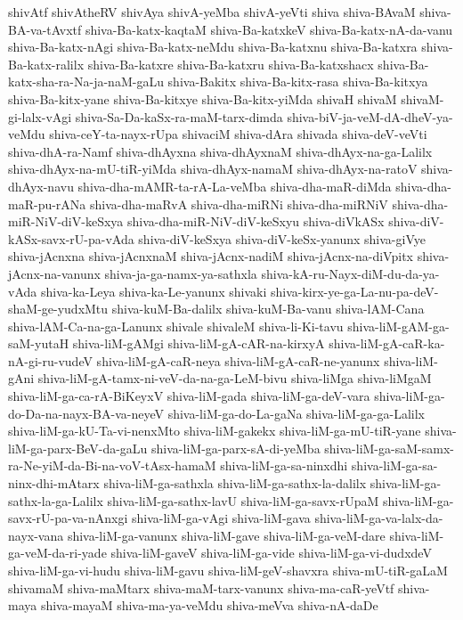 {shivAtf
shivAtheRV
shivAya
shivA-yeMba
shivA-yeVti
shiva
shiva-BAvaM
shiva-BA-va-tAvxtf
shiva-Ba-katx-kaqtaM
shiva-Ba-katxkeV
shiva-Ba-katx-nA-da-vanu
shiva-Ba-katx-nAgi
shiva-Ba-katx-neMdu
shiva-Ba-katxnu
shiva-Ba-katxra
shiva-Ba-katx-ralilx
shiva-Ba-katxre
shiva-Ba-katxru
shiva-Ba-katxshacx
shiva-Ba-katx-sha-ra-Na-ja-naM-gaLu
shiva-Bakitx
shiva-Ba-kitx-rasa
shiva-Ba-kitxya
shiva-Ba-kitx-yane
shiva-Ba-kitxye
shiva-Ba-kitx-yiMda
shivaH
shivaM
shivaM-gi-lalx-vAgi
shiva-Sa-Da-kaSx-ra-maM-tarx-dimda
shiva-biV-ja-veM-dA-dheV-ya-veMdu
shiva-ceY-ta-nayx-rUpa
shivaciM
shiva-dAra
shivada
shiva-deV-veVti
shiva-dhA-ra-Namf
shiva-dhAyxna
shiva-dhAyxnaM
shiva-dhAyx-na-ga-Lalilx
shiva-dhAyx-na-mU-tiR-yiMda
shiva-dhAyx-namaM
shiva-dhAyx-na-ratoV
shiva-dhAyx-navu
shiva-dha-mAMR-ta-rA-La-veMba
shiva-dha-maR-diMda
shiva-dha-maR-pu-rANa
shiva-dha-maRvA
shiva-dha-miRNi
shiva-dha-miRNiV
shiva-dha-miR-NiV-diV-keSxya
shiva-dha-miR-NiV-diV-keSxyu
shiva-diVkASx
shiva-diV-kASx-savx-rU-pa-vAda
shiva-diV-keSxya
shiva-diV-keSx-yanunx
shiva-giVye
shiva-jAcnxna
shiva-jAcnxnaM
shiva-jAcnx-nadiM
shiva-jAcnx-na-diVpitx
shiva-jAcnx-na-vanunx
shiva-ja-ga-namx-ya-sathxla
shiva-kA-ru-Nayx-diM-du-da-ya-vAda
shiva-ka-Leya
shiva-ka-Le-yanunx
shivaki
shiva-kirx-ye-ga-La-nu-pa-deV-shaM-ge-yudxMtu
shiva-kuM-Ba-dalilx
shiva-kuM-Ba-vanu
shiva-lAM-Cana
shiva-lAM-Ca-na-ga-Lanunx
shivale
shivaleM
shiva-li-Ki-tavu
shiva-liM-gAM-ga-saM-yutaH
shiva-liM-gAMgi
shiva-liM-gA-cAR-na-kirxyA
shiva-liM-gA-caR-ka-nA-gi-ru-vudeV
shiva-liM-gA-caR-neya
shiva-liM-gA-caR-ne-yanunx
shiva-liM-gAni
shiva-liM-gA-tamx-ni-veV-da-na-ga-LeM-bivu
shiva-liMga
shiva-liMgaM
shiva-liM-ga-ca-rA-BiKeyxV
shiva-liM-gada
shiva-liM-ga-deV-vara
shiva-liM-ga-do-Da-na-nayx-BA-va-neyeV
shiva-liM-ga-do-La-gaNa
shiva-liM-ga-ga-Lalilx
shiva-liM-ga-kU-Ta-vi-nenxMto
shiva-liM-gakekx
shiva-liM-ga-mU-tiR-yane
shiva-liM-ga-parx-BeV-da-gaLu
shiva-liM-ga-parx-sA-di-yeMba
shiva-liM-ga-saM-samx-ra-Ne-yiM-da-Bi-na-voV-tAsx-hamaM
shiva-liM-ga-sa-ninxdhi
shiva-liM-ga-sa-ninx-dhi-mAtarx
shiva-liM-ga-sathxla
shiva-liM-ga-sathx-la-dalilx
shiva-liM-ga-sathx-la-ga-Lalilx
shiva-liM-ga-sathx-lavU
shiva-liM-ga-savx-rUpaM
shiva-liM-ga-savx-rU-pa-va-nAnxgi
shiva-liM-ga-vAgi
shiva-liM-gava
shiva-liM-ga-va-lalx-da-nayx-vana
shiva-liM-ga-vanunx
shiva-liM-gave
shiva-liM-ga-veM-dare
shiva-liM-ga-veM-da-ri-yade
shiva-liM-gaveV
shiva-liM-ga-vide
shiva-liM-ga-vi-dudxdeV
shiva-liM-ga-vi-hudu
shiva-liM-gavu
shiva-liM-geV-shavxra
shiva-mU-tiR-gaLaM
shivamaM
shiva-maMtarx
shiva-maM-tarx-vanunx
shiva-ma-caR-yeVtf
shiva-maya
shiva-mayaM
shiva-ma-ya-veMdu
shiva-meVva
shiva-nA-daDe
}
